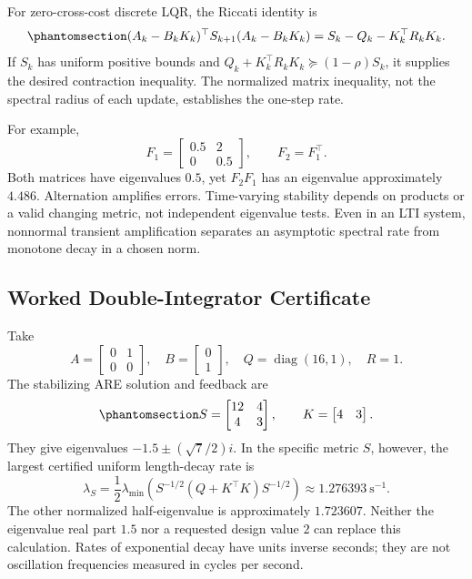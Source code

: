 \documentclass[
  10pt,
  letterpaper,
  DIV=11,
  numbers=noendperiod]{scrartcl}
\begin{document}
For zero-cross-cost discrete LQR, the Riccati identity is
\begin{equation}\phantomsection\label{eq-riccati-substitution}{
(A_k-B_kK_k)^\top S_{k+1}(A_k-B_kK_k)
=S_k-Q_k-K_k^\top R_kK_k.
}\end{equation} If \(S_k\) has uniform positive bounds and
\(Q_k+K_k^\top R_kK_k\succeq(1-\rho)S_k\), it supplies the desired
contraction inequality. The normalized matrix inequality, not the
spectral radius of each update, establishes the one-step rate.

For example, \[
F_1=\begin{bmatrix}0.5&2\\0&0.5\end{bmatrix},\qquad F_2=F_1^\top.
\] Both matrices have eigenvalues \(0.5\), yet \(F_2F_1\) has an
eigenvalue approximately \(4.486\). Alternation amplifies errors.
Time-varying stability depends on products or a valid changing metric,
not independent eigenvalue tests. Even in an LTI system, nonnormal
transient amplification separates an asymptotic spectral rate from
monotone decay in a chosen norm.

\subsection{Worked Double-Integrator
Certificate}\label{worked-double-integrator-certificate}

Take \[
A=\begin{bmatrix}0&1\\0&0\end{bmatrix},\quad
B=\begin{bmatrix}0\\1\end{bmatrix},\quad
Q=\operatorname{diag}(16,1),\quad R=1.
\] The stabilizing ARE solution and feedback are
\begin{equation}\phantomsection\label{eq-double-integrator-riccati}{
S=\begin{bmatrix}12&4\\4&3\end{bmatrix},\qquad K=\begin{bmatrix}4&3\end{bmatrix}.
}\end{equation} They give eigenvalues \(-1.5\pm(\sqrt7/2)i\). In the
specific metric \(S\), however, the largest certified uniform
length-decay rate is \[
\lambda_S=\frac12\lambda_{\min}\left(S^{-1/2}(Q+K^\top K)S^{-1/2}\right)
\approx1.276393\ \mathrm{s}^{-1}.
\] The other normalized half-eigenvalue is approximately \(1.723607\).
Neither the eigenvalue real part \(1.5\) nor a requested design value
\(2\) can replace this calculation. Rates of exponential decay have
units inverse seconds; they are not oscillation frequencies measured in
cycles per second.
\end{document}
